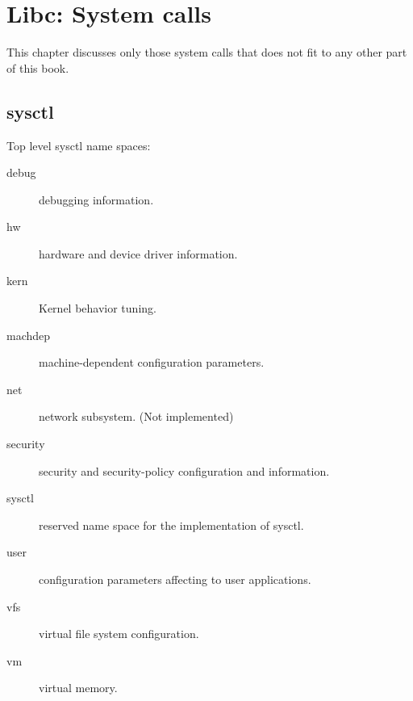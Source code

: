 \chapter{Libc: System calls}

This chapter discusses only those system calls that does not fit to any other
part of this book.

\section{sysctl}

Top level sysctl name spaces:

\begin{description}
\item[debug]    debugging information.
\item[hw]       hardware and device driver information.
\item[kern]     Kernel behavior tuning.
\item[machdep]  machine-dependent configuration parameters.
\item[net]      network subsystem. (Not implemented)
\item[security] security and security-policy configuration and information.
\item[sysctl]   reserved name space for the implementation of sysctl.
\item[user]     configuration parameters affecting to user applications.
\item[vfs]      virtual file system configuration.
\item[vm]       virtual memory.
\end{description}
